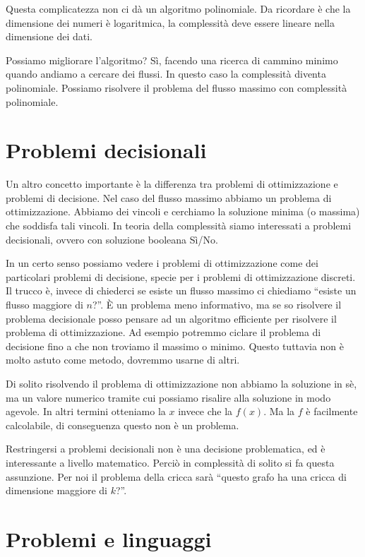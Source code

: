 Questa complicatezza non ci dà un algoritmo polinomiale. Da ricordare è che la dimensione dei
numeri è logaritmica, la complessità deve essere lineare nella dimensione dei dati.

Possiamo migliorare l'algoritmo? Sì, facendo una ricerca di cammino minimo quando andiamo a cercare
dei flussi. In questo caso la complessità diventa polinomiale. Possiamo risolvere il problema del
flusso massimo con complessità polinomiale.

\section{Problemi decisionali}

Un altro concetto importante è la differenza tra problemi di ottimizzazione e problemi di
decisione. Nel caso del flusso massimo abbiamo un problema di ottimizzazione. Abbiamo dei vincoli e
cerchiamo la soluzione minima (o massima) che soddisfa tali vincoli. In teoria della complessità
siamo interessati a problemi decisionali, ovvero con soluzione booleana Sì/No.

In un certo senso possiamo vedere i problemi di ottimizzazione come dei particolari problemi di
decisione, specie per i problemi di ottimizzazione discreti. Il trucco è, invece di chiederci se
esiste un flusso massimo ci chiediamo ``esiste un flusso maggiore di $n$?''. È un problema meno
informativo, ma se so risolvere il problema decisionale posso pensare ad un algoritmo efficiente per
risolvere il problema di ottimizzazione. Ad esempio potremmo ciclare il problema di decisione fino a
che non troviamo il massimo o minimo. Questo tuttavia non è molto astuto come metodo, dovremmo
usarne di altri.

Di solito risolvendo il problema di ottimizzazione non abbiamo la soluzione in sè, ma un valore
numerico tramite cui possiamo risalire alla soluzione in modo agevole. In altri termini otteniamo la
$x$ invece che la $f(x)$. Ma la $f$ è facilmente calcolabile, di conseguenza questo non è un
problema.

Restringersi a problemi decisionali non è una decisione problematica, ed è interessante a livello
matematico. Perciò in complessità di solito si fa questa assunzione. Per noi il problema della
cricca sarà ``questo grafo ha una cricca di dimensione maggiore di $k$?''.

\section{Problemi e linguaggi}

